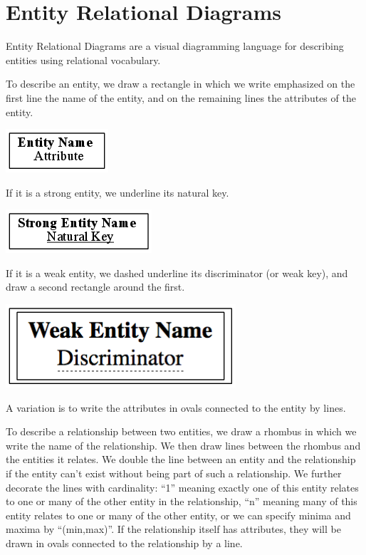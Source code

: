 \chapter{Entity Relational Diagrams}

Entity Relational Diagrams are a visual diagramming language for
describing entities using relational vocabulary.

To describe an entity, we draw a rectangle in which we write
emphasized on the first line the name of the entity, and on the
remaining lines the attributes of the entity.  

\includegraphics{figs/entity.png}

If it is a strong entity, we underline its natural key.  

\includegraphics{figs/strong_entity.png}

If it is a weak entity, we dashed underline its discriminator (or weak
key), and draw a second rectangle around the first.

\includegraphics[scale=0.7]{figs/weak_entity.png}

A variation is to write the attributes in ovals connected to the
entity by lines.

To describe a relationship between two entities, we draw a rhombus in
which we write the name of the relationship.  We then draw lines
between the rhombus and the entities it relates.  We double the line
between an entity and the relationship if the entity can't exist
without being part of such a relationship.  We further decorate the
lines with cardinality: ``1'' meaning exactly one of this entity
relates to one or many of the other entity in the relationship, ``n''
meaning many of this entity relates to one or many of the other
entity, or we can specify minima and maxima by ``(min,max)''.  If the
relationship itself has attributes, they will be drawn in ovals
connected to the relationship by a line.
